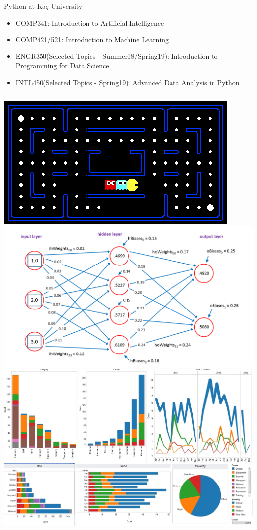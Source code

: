 	\begin{frame}{Python at Koç University}
		\begin{itemize}
			\LARGE
			\item COMP341: Introduction to Artificial Intelligence
			\item COMP421/521: Introduction to Machine Learning
			\item ENGR350(Selected Topics - Summer18/Spring19): Introduction to Programming for Data Science
			\item INTL450(Selected Topics - Spring19): Advanced Data Analysis in Python
		\end{itemize}
		\begin{columns}
				\includegraphics[width=\textwidth]{images/berkeley_pacman.png}
				\includegraphics[width=\textwidth]{images/nn.jpg}
				\includegraphics[width=\textwidth]{images/analysis.jpeg}

\end{columns}
\end{frame}
